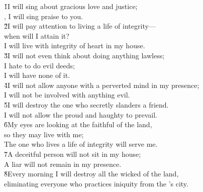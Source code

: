 \begin{poetry}
\poeml \v{1}I will sing about gracious love and justice; \\
\poemll    {}, I will sing praise to you. \\
\poeml \v{2}I will pay attention to living a life of integrity--- \\
\poemll    when will I attain it? \\
\poemlll       I will live with integrity of heart in my house. \\
\poeml \v{3}I will not even think about doing anything lawless; \\
\poemll    I hate to do evil deeds; \\
\poemlll       I will have none of it. \\
\poeml \v{4}I will not allow anyone with a perverted mind in my presence; \\
\poemll    I will not be involved with anything evil. \\
\poeml \v{5}I will destroy the one who secretly slanders a friend. \\
\poemll    I will not allow the proud and haughty to prevail. \\
\poeml \v{6}My eyes are looking at the faithful of the land, \\
\poemll    so they may live with me; \\
\poemlll       The one who lives a life of integrity will serve me. \\
\poeml \v{7}A deceitful person will not sit in my house; \\
\poemll    A liar will not remain in my presence. \\
\poeml \v{8}Every morning I will destroy all the wicked of the land, \\
\poemll    eliminating everyone who practices iniquity from the 's city.
\end{poetry}

